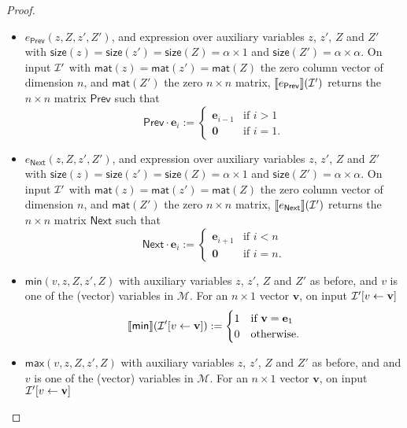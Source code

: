 \begin{proof}
    \begin{itemize}
        \item $e_{\mathsf{Prev}}(z,Z,z',Z')$, and expression over auxiliary variables $z$, $z'$, $Z$ and $Z'$ with 
        $\mathsf{size}(z)=\mathsf{size}(z')=\mathsf{size}(Z)=\alpha\times 1$ and 
        $\mathsf{size}(Z')=\alpha\times\alpha$. On input $\mathcal{I}'$ with 
        $\mathsf{mat}(z)=\mathsf{mat}(z')=\mathsf{mat}(Z)$ the zero column vector of dimension $n$, 
        and $\mathsf{mat}(Z')$ the zero $n\times n$ matrix,
        $\llbracket e_{\mathsf{Prev}} \rrbracket(\mathcal{I}')$ returns the $n\times n$ matrix $\mathsf{Prev}$ such that 
        $$\mathsf{Prev}\cdot \mathbf{e}_i:=\begin{cases} 
        \mathbf{e}_{i-1} & \text{if $i>1$}\\
        \mathbf{0} & \text{if $i=1$}.
        \end{cases}
        $$
        \item $e_{\mathsf{Next}}(z,Z,z',Z')$, and expression over auxiliary variables $z$, $z'$, $Z$ and $Z'$ 
        with $\mathsf{size}(z)=\mathsf{size}(z')=\mathsf{size}(Z)=\alpha\times 1$ and 
        $\mathsf{size}(Z')=\alpha\times\alpha$. On input $\mathcal{I}'$ with 
        $\mathsf{mat}(z)=\mathsf{mat}(z')=\mathsf{mat}(Z)$ the zero column 
        vector of dimension $n$, and $\mathsf{mat}(Z')$ the zero $n\times n$ matrix,
        $\llbracket e_{\mathsf{Next}} \rrbracket(\mathcal{I}')$ returns the $n\times n$ matrix $\mathsf{Next}$ such that 
        $$\mathsf{Next}\cdot \mathbf{e}_i:=\begin{cases} 
        \mathbf{e}_{i+1} & \text{if $i<n$}\\
        \mathbf{0} & \text{if $i=n$}.
        \end{cases}
        $$
        \item $\textsf{min}(v,z,Z,z',Z)$ with auxiliary variables $z$, $z'$, $Z$ and $Z'$ as before, 
        and $v$ is one of the (vector) variables in $\mathcal{M}$. For an $n\times 1$ vector $\mathbf{v}$, 
        on input $\mathcal{I}'[v\gets \mathbf{v}]$	$$\llbracket \mathsf{min} \rrbracket(\mathcal{I}'[v\gets\mathbf{v}]):=\begin{cases} 1 & \text{if $\mathbf{v}=\mathbf{e}_1$}\\
            0 & \text{otherwise}.
            \end{cases}$$

        \item $\textsf{max}(v,z,Z,z',Z)$ with auxiliary variables $z$, $z'$, $Z$ and $Z'$ as before, and 
        and $v$ is one of the (vector) variables in $\mathcal{M}$. For an $n\times 1$ vector $\mathbf{v}$, 
        on input $\mathcal{I}'[v\gets \mathbf{v}]$
        

\end{itemize}
\end{proof}
